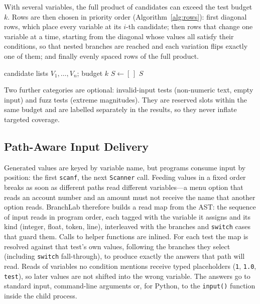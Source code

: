 \documentclass[conference]{IEEEtran}
\begin{document}
With several variables, the full product of candidates can exceed the test budget $k$. Rows are then chosen in
priority order (Algorithm~\ref{alg:rows}): first diagonal rows, which place every variable at its $i$-th
candidate; then rows that change one variable at a time, starting from the diagonal whose values all satisfy
their conditions, so that nested branches are reached and each variation flips exactly one of them; and finally
evenly spaced rows of the full product.

\begin{algorithm}[t]
\caption{Budgeted row selection}\label{alg:rows}
\begin{algorithmic}[1]
\Require candidate lists $V_1,\dots,V_n$; budget $k$
\State $S \gets [\,]$ 
  \State {}
\EndFor
{}
    \State {}
  \EndFor
\EndFor
{}
  \State {}
\EndFor
\State {}
\State \Return $S$
\end{algorithmic}
\end{algorithm}

Two further categories are optional: invalid-input tests (non-numeric text, empty input) and fuzz tests
(extreme magnitudes). They are reserved slots within the same budget and are labelled separately in the
results, so they never inflate targeted coverage.

\subsection{Path-Aware Input Delivery}
Generated values are keyed by variable name, but programs consume input by position: the first
\texttt{scanf}, the next \texttt{Scanner} call. Feeding values in a fixed order breaks as soon as different
paths read different variables---a menu option that reads an account number and an amount must not receive the
name that another option reads. BranchLab therefore builds a read map from the AST: the sequence of input reads
in program order, each tagged with the variable it assigns and its kind (integer, float, token, line),
interleaved with the branches and \texttt{switch} cases that guard them. Calls to helper functions are inlined.
For each test the map is resolved against that test's own values, following the branches they select
(including \texttt{switch} fall-through), to produce exactly the answers that path will read. Reads of
variables no condition mentions receive typed placeholders (\texttt{1}, \texttt{1.0}, \texttt{test}), so later
values are not shifted into the wrong variable. The answers go to standard input, command-line arguments or,
for Python, to the \texttt{input()} function inside the child process.
\end{document}
